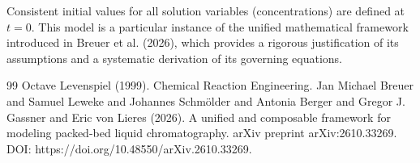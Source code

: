 \documentclass{article}
\begin{document}
Consistent initial values for all solution variables (concentrations) are defined at $t = 0$.
This model is a particular instance of the unified mathematical framework introduced in Breuer et al. (2026), which provides a rigorous justification of its assumptions and a systematic derivation of its governing equations.
\begin{thebibliography}{99}
     Octave Levenspiel (1999). Chemical Reaction Engineering.
     Jan Michael Breuer and Samuel Leweke and Johannes Schmölder and Antonia Berger and Gregor J. Gassner and Eric von Lieres (2026). A unified and composable framework for modeling packed-bed liquid chromatography. arXiv preprint arXiv:2610.33269. DOI: https://doi.org/10.48550/arXiv.2610.33269.
\end{thebibliography}
\end{document}
